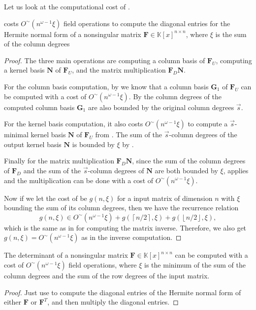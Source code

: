 Let us look at the computational cost of . 
\begin{thm}
 costs $O^{\sim}\left(n^{\omega-1}\xi\right)$
field operations to compute the diagonal entries for the Hermite normal
form of a nonsingular matrix $\mathbf{F}\in\mathbb{K}\left[x\right]^{n\times n}$,
where $\xi$ is the sum of the column degrees \end{thm}
\begin{proof}
The three main operations are computing a column basis of $\mathbf{F}_{U}$,
computing a kernel basis $\mathbf{N}$ of $\mathbf{F}_{U}$, and the
matrix multiplication $\mathbf{F}_{D}\mathbf{N}$.

For the column basis computation, by 
we know that a column basis $\mathbf{G}_{1}$ of $\mathbf{F}_{U}$
can be computed with a cost of $O^{\sim}\left(n^{\omega-1}\xi\right).$
By  the column degrees
of the computed column basis $\mathbf{G}_{1}$ are also bounded by
the original column degrees $\vec{s}$.

For the kernel basis computation, it also costs $O^{\sim}\left(n^{\omega-1}\xi\right)$
to compute a $\vec{s}$-minimal kernel basis $\mathbf{N}$ of $\mathbf{F}_{U}$
from . The sum of the $\vec{s}$-column
degrees of the output kernel basis $\mathbf{N}$ is bounded by $\xi$
by .

Finally for the matrix multiplication $\mathbf{F}_{D}\mathbf{N}$,
since the sum of the column degrees of $\mathbf{F}_{D}$ and the sum
of the $\vec{s}$-column degrees of $\mathbf{N}$ are both bounded
by $\xi$,  applies and
the multiplication can be done with a cost of $O^{\sim}\left(n^{\omega-1}\xi\right)$.

Now if we let the cost of  be $g(n,\xi)$
for a input matrix of dimension $n$ with $\xi$ bounding the sum
of its column degrees, then we have the recurrence relation
\[
g(n,\xi)\in O^{\sim}(n^{\omega-1}\xi)+g(\left\lceil n/2\right\rceil ,\xi)+g(\left\lfloor n/2\right\rfloor ,\xi),
\]
 which is the same as in  for computing
the matrix inverse. Therefore, we also get $g(n,\xi)=O^{\sim}(n^{\omega-1}\xi)$
as in the inverse computation.\end{proof}
\begin{cor}
The determinant of a nonsingular matrix $\mathbf{F}\in\mathbb{K}\left[x\right]^{n\times n}$
can be computed with a cost of $O^{\sim}(n^{\omega-1}\xi)$ field
operations, where $\xi$ is the minimum of the sum of the column degrees
and the sum of the row degrees of the input matrix.\end{cor}
\begin{proof}
Just use  to compute the diagonal
entries of the Hermite normal form of either $\mathbf{F}$ or $\mathbf{F}^{T}$,
and then multiply the diagonal entries.\end{proof}


